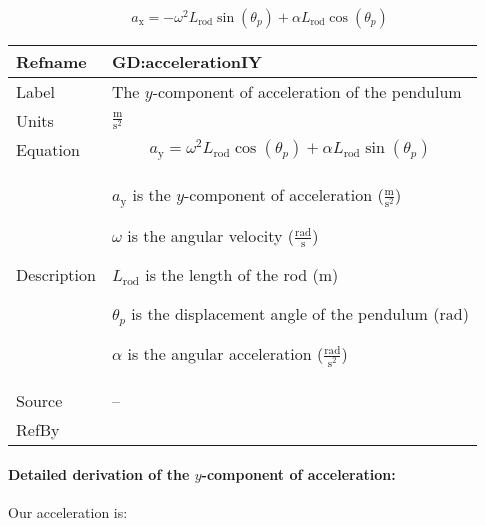 \documentclass[12pt]{article}
\begin{document}
\begin{displaymath}
{a_{\text{x}}}=-ω^{2} {L_{\text{rod}}} \sin\left({θ_{p}}\right)+α {L_{\text{rod}}} \cos\left({θ_{p}}\right)
\end{displaymath}
\vspace{\baselineskip}
\noindent
\begin{minipage}{\textwidth}
\begin{tabular}{>{\raggedright}p{}>{\raggedright\arraybackslash}p{}}
\toprule \textbf{Refname} & \textbf{GD:accelerationIY}
\label{GD:accelerationIY}
\\ \midrule
Label & The $y$-component of acceleration of the pendulum
        
\\ \midrule
Units & $\frac{\text{m}}{\text{s}^{2}}$
        
\\ \midrule
Equation & \begin{displaymath}
           {a_{\text{y}}}=ω^{2} {L_{\text{rod}}} \cos\left({θ_{p}}\right)+α {L_{\text{rod}}} \sin\left({θ_{p}}\right)
           \end{displaymath}
\\ \midrule
Description & \begin{symbDescription}
              \item{${a_{\text{y}}}$ is the $y$-component of acceleration ($\frac{\text{m}}{\text{s}^{2}}$)}
              \item{$ω$ is the angular velocity ($\frac{\text{rad}}{\text{s}}$)}
              \item{${L_{\text{rod}}}$ is the length of the rod (${\text{m}}$)}
              \item{${θ_{p}}$ is the displacement angle of the pendulum (${\text{rad}}$)}
              \item{$α$ is the angular acceleration ($\frac{\text{rad}}{\text{s}^{2}}$)}
              \end{symbDescription}
\\ \midrule
Source & --
         
\\ \midrule
RefBy & 
\\ \bottomrule
\end{tabular}
\end{minipage}
\paragraph{Detailed derivation of the $y$-component of acceleration:}
\label{GD:accelerationIYDeriv}
Our acceleration is:
\end{document}
